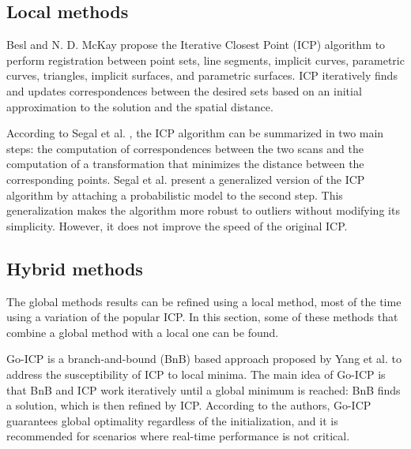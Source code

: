         \subsection{Local methods} 

        Besl and N. D. McKay \cite{Besl_1992_amethod} propose the Iterative Closest Point (ICP) algorithm to perform registration 
        between point sets, line segments, implicit curves, parametric curves, triangles, implicit surfaces, and parametric surfaces.
        ICP iteratively finds and updates correspondences between the desired sets based on an initial approximation to the solution and 
        the spatial distance.

        According to Segal et al. \cite{Segal_2009_generalizedicp}, the ICP algorithm can be summarized in two main steps:
        the computation of correspondences between the two scans and 
        the computation of a transformation that minimizes the distance between the corresponding points.
        Segal et al. present a generalized version of the ICP algorithm by attaching a probabilistic model to the second step.
        This generalization makes the algorithm more robust to outliers without modifying its simplicity. 
        However, it does not improve the speed of the original ICP.


        \subsection{Hybrid methods} 

        The global methods results can be refined using a local method, most of the time using a variation of the popular ICP. 
        In this section, some of these methods that combine a global method with a local one can be found.

        Go-ICP is a branch-and-bound (BnB) based approach proposed by Yang et al. \cite{Yang_2016_goicp} to address the susceptibility of ICP to local minima. 
        The main idea of Go-ICP is that BnB and ICP work iteratively until a global minimum is reached: BnB finds a solution, which is then refined by ICP.
        According to the authors, Go-ICP guarantees global optimality regardless of the initialization, and it is recommended for scenarios where real-time performance is not critical.

